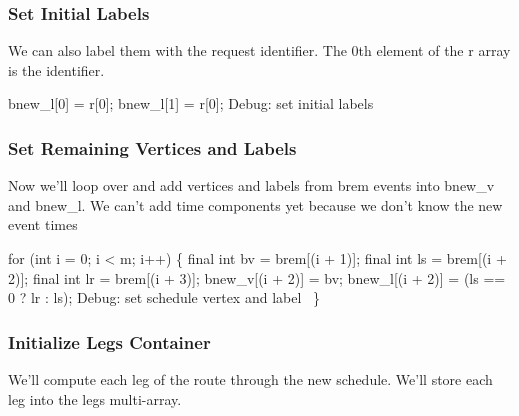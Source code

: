 \subsubsection{Set Initial Labels}

We can also label them with the request identifier. The 0th element of the
{\Tt{}r\nwendquote} array is the identifier.

\nwenddocs{}\endmoddef\nwstartdeflinemarkup{}\nwenddeflinemarkup
bnew_l[0] = r[0];
bnew_l[1] = r[0];
\LA{}Debug: set initial labels~{\nwtagstyle{}}\RA{}
\nwendcode{}\nwdocspar

\subsubsection{Set Remaining Vertices and Labels}

Now we'll loop over and add vertices and labels from {\Tt{}brem\nwendquote} events into
{\Tt{}bnew{\_}v\nwendquote} and {\Tt{}bnew{\_}l\nwendquote}. We can't add time components yet because we
don't know the new event times

\nwenddocs{}\endmoddef\nwstartdeflinemarkup{}\nwenddeflinemarkup
for (int i = 0; i < m; i++) \{
  final int bv = brem[(i + 1)];
  final int ls = brem[(i + 2)];
  final int lr = brem[(i + 3)];
  bnew_v[(i + 2)] = bv;
  bnew_l[(i + 2)] = (ls == 0 ? lr : ls);
  \LA{}Debug: set schedule vertex and label~{\nwtagstyle{}}\RA{}
\}
\nwendcode{}\nwdocspar

\subsubsection{Initialize Legs Container}

We'll compute each leg of the route through the new schedule. We'll store
each leg into the {\Tt{}legs\nwendquote} multi-array.


